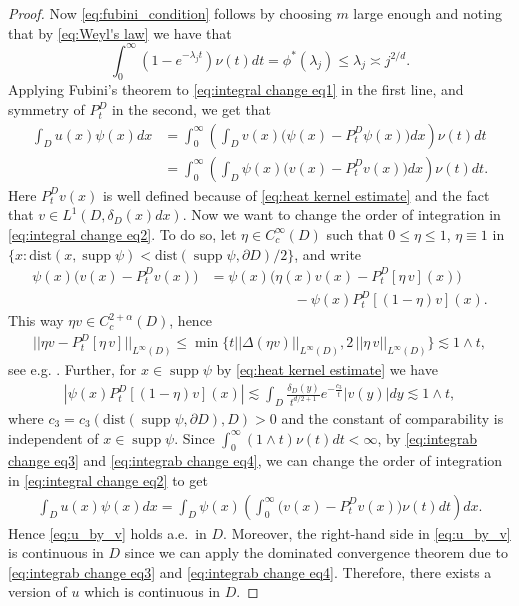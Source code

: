 \documentclass[12pt,a4paper,onecolumn]{amsart}
\DeclareMathOperator\supp{supp}
\theoremstyle{definition}
\newcommand{\1}{\mathbf 1}
\newcommand{\LLL}{L^1(D,\de(x)dx)}
\newcommand{\de}{\delta_D}
\newcommand{\dist}{\textrm{dist}}
\numberwithin{equation}{section}
\begin{document}
\begin{proof}
Now \eqref{eq:fubini_condition}	follows by choosing $m$ large enough and noting that by \eqref{eq:Weyl's law} we have that 
\[
\int_0^\infty(1-e^{-\lambda_j t})\nu(t)dt=\phi^*(\lambda_j)\le \lambda_j\asymp j^{2/d}.
\]Applying Fubini's theorem to \eqref{eq:integral change eq1} in the first line, and symmetry of $P_t^D$ in the second, we get that
	\begin{align}
		\int_D u(x)\psi(x)dx&=\int_0^\infty\left(\int_Dv(x)\big(\psi(x)-P_t^D\psi(x)\big)dx\right)\nu(t)dt\nonumber\\
		&=\int_0^\infty\left(\int_D\psi(x)\big(v(x)-P_t^Dv(x)\big)dx\right)\nu(t)dt.\label{eq:integral change eq2}
	\end{align}
	Here $P_t^Dv(x)$ is well defined because of \eqref{eq:heat kernel estimate} and the fact that $v\in \LLL$. Now we want to change the order of integration in \eqref{eq:integral change eq2}. To do so, let $\eta\in C_c^\infty(D)$ such that $0\le \eta \le 1$, $\eta\equiv 1$ in $\{x:\dist(x,\supp \psi)<\dist(\supp \psi, \partial D)/2\}$, and write
	\begin{align*}
		\psi(x)\big(v(x)-P_t^Dv(x)\big)&=\psi(x)\big(\eta(x)v(x)-P_t^D[\eta \,v](x)\big)\\&\hspace{6em}{-}\psi(x)P_t^D[(1-\eta)v](x).
	\end{align*}
	This way $\eta v \in C^{2+\alpha}_c(D)$, hence 
	\begin{align}\label{eq:integrab change eq3}
		||\eta v-P_t^D[\eta \,v]||_{L^\infty(D)}\le\min\{t ||\Delta(\eta v)||_{L^\infty(D)}, 2\,||\eta\, v||_{L^\infty(D)}\}\lesssim 1\wedge t,
	\end{align}
	see e.g. \cite[Eq. (13.3)]{bernstein}. Further, for $x\in \supp \psi$ by \eqref{eq:heat kernel estimate} we have
	\begin{align}\label{eq:integrab change eq4}
		|\psi(x)P_t^D[(1-\eta)v](x)|\lesssim \int_{D} \frac{\de(y)}{t^{d/2+1}}e^{-\frac{c_3}{t}} |v(y)| dy\lesssim 1\wedge t,
	\end{align}
	where $c_3=c_3(\dist(\supp\psi,\partial D),D)>0$ and the constant of comparability is independent of $x\in \supp \psi$. Since $\int_0^\infty(1\wedge t)\nu(t)dt<\infty$, by \eqref{eq:integrab change eq3} and \eqref{eq:integrab change eq4}, we can change the order of integration in \eqref{eq:integral change eq2} to get
	\begin{align*}
			\int_D u(x)\psi(x)dx=\int_D\psi(x)\left(\int_0^\infty\big(v(x)-P_t^Dv(x)\big)\nu(t)dt\right)dx.
	\end{align*}
	Hence \eqref{eq:u_by_v} holds a.e.~in $D$. Moreover, the right-hand side in \eqref{eq:u_by_v} is continuous in $D$ since we can apply the dominated convergence theorem due to \eqref{eq:integrab change eq3} and \eqref{eq:integrab change eq4}. Therefore, there exists a version of $u$ which is continuous in $D$. 
	

\end{proof}
\end{document}

